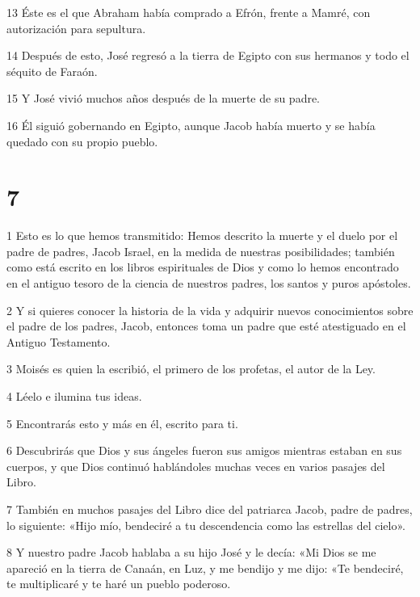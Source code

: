 \par 13 Éste es el que Abraham había comprado a Efrón, frente a Mamré, con autorización para sepultura.

\par 14 Después de esto, José regresó a la tierra de Egipto con sus hermanos y todo el séquito de Faraón.

\par 15 Y José vivió muchos años después de la muerte de su padre.

\par 16 Él siguió gobernando en Egipto, aunque Jacob había muerto y se había quedado con su propio pueblo.

\chapter{7}

\par 1 Esto es lo que hemos transmitido: Hemos descrito la muerte y el duelo por el padre de padres, Jacob Israel, en la medida de nuestras posibilidades; también como está escrito en los libros espirituales de Dios y como lo hemos encontrado en el antiguo tesoro de la ciencia de nuestros padres, los santos y puros apóstoles.

\par 2 Y si quieres conocer la historia de la vida y adquirir nuevos conocimientos sobre el padre de los padres, Jacob, entonces toma un padre que esté atestiguado en el Antiguo Testamento.

\par 3 Moisés es quien la escribió, el primero de los profetas, el autor de la Ley.

\par 4 Léelo e ilumina tus ideas.

\par 5 Encontrarás esto y más en él, escrito para ti.

\par 6 Descubrirás que Dios y sus ángeles fueron sus amigos mientras estaban en sus cuerpos, y que Dios continuó hablándoles muchas veces en varios pasajes del Libro.

\par 7 También en muchos pasajes del Libro dice del patriarca Jacob, padre de padres, lo siguiente: «Hijo mío, bendeciré a tu descendencia como las estrellas del cielo».

\par 8 Y nuestro padre Jacob hablaba a su hijo José y le decía: «Mi Dios se me apareció en la tierra de Canaán, en Luz, y me bendijo y me dijo: «Te bendeciré, te multiplicaré y te haré un pueblo poderoso.

